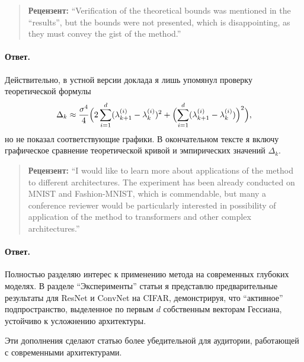 \documentclass[11pt]{article}
\begin{document}
\begin{quote}
    \textbf{Рецензент:}
    ``Verification of the theoretical bounds was mentioned in the “results”, but the bounds were not presented, which is
    disappointing, as they must convey the gist of the method.''
\end{quote}

\paragraph{Ответ.}
Действительно, в устной версии доклада я лишь упомянул проверку теоретической формулы
$$\Delta_k \approx \frac{\sigma^4}{4}\Bigl(2\sum_{i=1}^d(\lambda^{(i)}_{k+1}-\lambda^{(i)}_k)^2
    +\Bigl(\sum_{i=1}^d(\lambda^{(i)}_{k+1}-\lambda^{(i)}_k)\Bigr)^2\Bigr),$$
но не показал соответствующие графики. В окончательном тексте я включу графическое сравнение теоретической кривой и
эмпирических значений $\Delta_k$.

\begin{quote}
    \textbf{Рецензент:}
    ``I would like to learn more about applications of the method to different architectures. The experiment has been already
    conducted on MNIST and Fashion-MNIST, which is commendable, but many a conference reviewer would be particularly
    interested in possibility of application of the method to transformers and other complex architectures.''
\end{quote}

\paragraph{Ответ.}
Полностью разделяю интерес к применению метода на современных глубоких моделях. В разделе ``Эксперименты'' статьи я представлю
предварительные результаты для ResNet и ConvNet на CIFAR,
демонстрируя, что ``активное'' подпространство, выделенное по первым $d$ собственным векторам Гессиана, устойчиво к
усложнению архитектуры.

Эти дополнения сделают статью более убедительной для аудитории, работающей с современными архитектурами.
\end{document}
